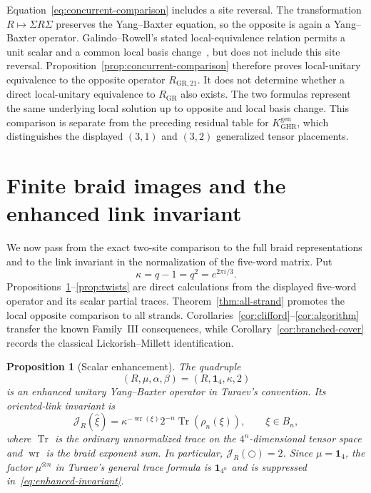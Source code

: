 \documentclass[11pt]{article}
\newtheorem{proposition}[theorem]{Proposition}
\theoremstyle{remark}
\newcommand{\Id}{\mathbf 1}
\newcommand{\Tr}{\operatorname{Tr}}
\begin{document}
Equation~\eqref{eq:concurrent-comparison} includes a site reversal.  The
transformation \(R\mapsto\Sigma R\Sigma\) preserves the Yang--Baxter equation,
so the opposite is again a Yang--Baxter operator.  Galindo--Rowell's stated
local-equivalence relation permits a unit scalar and a common local basis
change~\cite[\S2]{GalindoRowell2026}, but does not include this site reversal.
Proposition~\ref{prop:concurrent-comparison} therefore proves local-unitary
equivalence to the opposite operator \(R_{\mathrm{GR},21}\).  It does not
determine whether a direct local-unitary equivalence to \(R_{\mathrm{GR}}\)
also exists.  The two formulas represent the same underlying local solution up
to opposite and local basis change.  This comparison is separate from the
preceding residual table for \(K_{\mathrm{GHR}}^{\mathrm{gen}}\), which
distinguishes the displayed \((3,1)\) and \((3,2)\) generalized tensor
placements.

\section{Finite braid images and the enhanced link invariant}
\label{sec:global}

We now pass from the exact two-site comparison to the full braid
representations and to the link invariant in the normalization of the
five-word matrix.  Put
\[
  \kappa=q-1=q^2=e^{2\pi i/3}.
\]
Propositions~\ref{prop:enhancement}--\ref{prop:twists} are direct calculations
from the displayed five-word operator and its scalar partial traces.
Theorem~\ref{thm:all-strand} promotes the local opposite comparison to all
strands.  Corollaries~\ref{cor:clifford}--\ref{cor:algorithm} transfer the known
Family~III consequences, while Corollary~\ref{cor:branched-cover} records the
classical Lickorish--Millett identification.

\begin{proposition}[Scalar enhancement]\label{prop:enhancement}
The quadruple
\[
  (R,\mu,\alpha,\beta)=(R,\Id_4,\kappa,2)
\]
is an enhanced unitary Yang--Baxter operator in Turaev's convention.  Its
oriented-link invariant is
\begin{equation}
  \mathcal J_R(\widehat\xi)
  =\kappa^{-\operatorname{wr}(\xi)}2^{-n}
   \Tr(\rho_n(\xi)),
  \qquad \xi\in B_n,
  \label{eq:enhanced-invariant}
\end{equation}
where \(\Tr\) is the ordinary unnormalized trace on the \(4^n\)-dimensional
tensor space and \(\operatorname{wr}\) is the braid exponent sum.  In
particular, \(\mathcal J_R(\bigcirc)=2\).  Since \(\mu=\Id_4\), the factor
\(\mu^{\otimes n}\) in Turaev's general trace formula is \(\Id_{4^n}\) and is
suppressed in~\eqref{eq:enhanced-invariant}.
\end{proposition}
\end{document}
